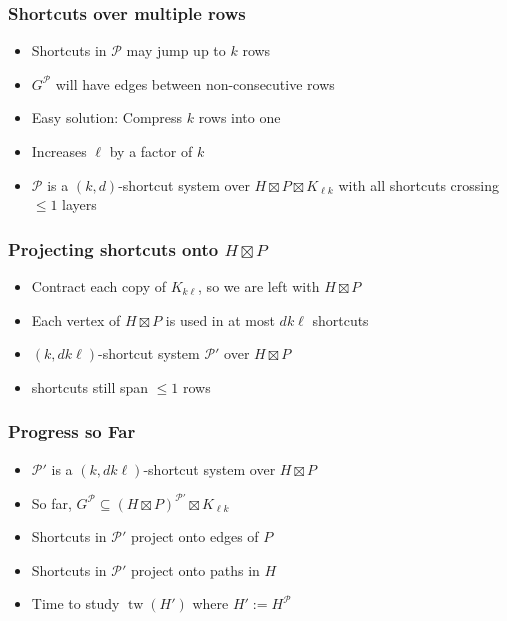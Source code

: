 \documentclass[xcolor=dvipsnames]{beamer}
\DeclareMathOperator{\tw}{tw}
\begin{document}
\begin{frame}
  \frametitle{Shortcuts over multiple rows}

  \begin{itemize}
    \item Shortcuts in $\mathcal{P}$ may jump up to $k$ rows
    \item $G^\mathcal{P}$ will have edges between non-consecutive rows
    \item<2-> Easy solution: Compress $k$ rows into one
  \end{itemize}
    \begin{center}
    \end{center}
  \begin{itemize}
    \item<3-> Increases $\ell$ by a factor of $k$
    \item<4-> $\mathcal{P}$ is a $(k,d)$-shortcut system over $H\boxtimes P\boxtimes K_{\ell k}$ with all shortcuts crossing $\le\!\! 1$ layers
  \end{itemize}
\end{frame}

\begin{frame}
  \frametitle{Projecting shortcuts onto $H\boxtimes P$}

  \begin{itemize}
    \item<2-> Contract each copy of $K_{k\ell}$, so we are left with $H\boxtimes P$
  \end{itemize}
    \begin{center}
    \end{center}
  \begin{itemize}
    \item<3-> Each vertex of $H\boxtimes P$ is used in at most $dk\ell$ shortcuts
    \item<4-> $(k,dk\ell)$-shortcut system $\mathcal{P'}$ over $H\boxtimes P$
    \item<4-> shortcuts still span $\le\!\!1$ rows
  \end{itemize}
\end{frame}

\begin{frame}
  \frametitle{Progress so Far}

  \begin{itemize}
    \item $\mathcal{P'}$ is a $(k,dk\ell)$-shortcut system over $H\boxtimes P$
    \item So far, $G^{\mathcal{P}}\subseteq (H\boxtimes P)^\mathcal{P'}\boxtimes K_{\ell k}$
    \item Shortcuts in $\mathcal{P'}$ project onto edges of $P$
    \item Shortcuts in $\mathcal{P'}$ project onto paths in $H$
    \item Time to study $\tw(H')$ where $H':=H^{\mathcal{P}}$
  \end{itemize}
\end{frame}
\end{document}
